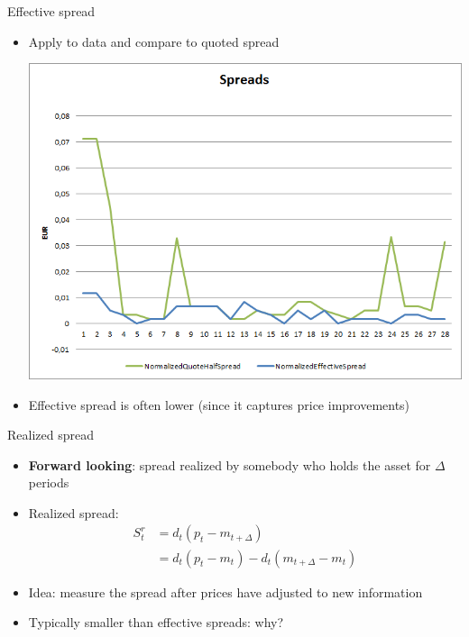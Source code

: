 \documentclass[english,10pt]{beamer}
\begin{document}
\begin{frame}{Effective spread}
	\begin{itemize}
		\item Apply to data and compare to quoted spread
		\begin{center}
			\includegraphics[scale=0.39]{pics/L2_effectivespread}
		\end{center}
		\item Effective spread is often lower (since it captures price improvements)
	\end{itemize}
\end{frame}


\begin{frame}{Realized spread}
	\begin{itemize}
		\item \textbf{Forward looking}: spread realized by somebody who holds the asset for $\Delta$ periods
		\item \alert{Realized spread}:
		\begin{align*}
		S^r_t & = d_t(p_t - m_{t+\Delta}) \\
		& = d_t(p_t-m_t) - d_t(m_{t+\Delta}-m_t)
		\end{align*}
		\item Idea: measure the spread after prices have adjusted to new information
		\item Typically smaller than effective spreads: why?
	\end{itemize}
\end{frame}
\end{document}
